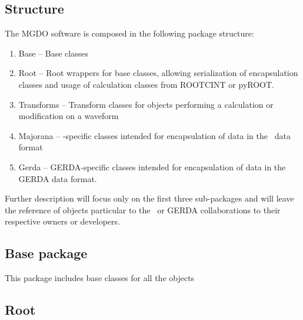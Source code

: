 		\subsection{Structure}
		
		The MGDO software is composed in the following package structure:

			\begin{enumerate}
				\item Base -- Base classes
				\item Root -- Root wrappers for base classes, allowing serialization of encapsulation classes and usage of calculation classes from ROOTCINT or pyROOT.
				\item Transforms -- Transform classes for objects performing a calculation or modification on a waveform
				\item Majorana -- \MJ-specific classes intended for encapsulation of data in the \MJ~data format
				\item Gerda -- GERDA-specific classes intended for encapsulation of data in the GERDA data format.
			\end{enumerate}
		Further description will focus only on the first three sub-packages and will leave the reference of objects particular to the \MJ~or GERDA collaborations to their respective owners or developers.
		
		\subsection{Base package}
	This package includes base classes for all the objects 
		\subsection{Root}
			
